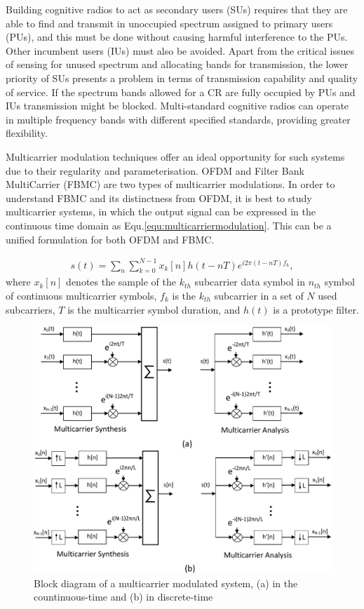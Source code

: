 Building cognitive radios to act as secondary users (SUs) requires that they are able to find and transmit in unoccupied spectrum assigned to primary users (PUs), and this must be done without causing harmful interference to the PUs.
Other incumbent users (IUs) must also be avoided.
Apart from the critical issues of sensing for unused spectrum and allocating bands for transmission, the lower priority of SUs presents a problem in terms of transmission capability and quality of service.
If the spectrum bands allowed for a CR are fully occupied by PUs and IUs transmission might be blocked.
Multi-standard cognitive radios can operate in multiple frequency bands with different specified standards, providing greater flexibility.

Multicarrier modulation techniques offer an ideal opportunity for such systems due to their regularity and parameterisation. OFDM and Filter Bank MultiCarrier (FBMC) are two types of multicarrier modulations.
In order to understand FBMC and its distinctness from OFDM, it is best to study multicarrier systems, in which the output signal can be expressed in the continuous time domain as Equ.\ref{equ:multicarriermodulation}. 
This can be a unified formulation for both OFDM and FBMC.
 
\begin{eqnarray}
\label{equ:multicarriermodulation}
s(t) = \sum_{n}\sum_{k  = 0}^{N-1} x_{k}[n] h(t-nT)e^{i2\pi (t-nT)f_{k}},
\end{eqnarray}	
where $x_{k}[n]$ denotes the sample of the $k_{th}$ subcarrier data symbol in $n_{th}$ symbol of continuous multicarrier symbols, $f_{k}$ is the $k_{th}$ subcarrier in a set of $N$ used subcarriers, $T$ is the multicarrier symbol duration, and $h(t)$ is a prototype filter.
 
\begin{figure}
	\centerline{\includegraphics [width=0.8\columnwidth] {Figures/multucarrier_system} }
 	\caption{Block diagram of a multicarrier modulated system, (a) in the countinuous-time and (b) in discrete-time}
 	\label{fig:multicarrier-block}
\end{figure}
 
